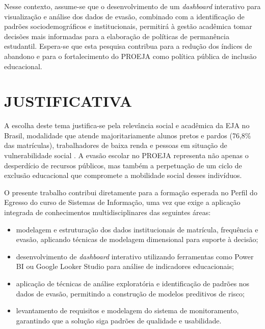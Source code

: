 \documentclass[12pt,a4paper]{article}
\begin{document}
Nesse contexto, assume-se que o desenvolvimento de um \textit{dashboard} interativo para visualização e análise dos dados de evasão, combinado com a identificação de padrões sociodemográficos e institucionais, permitirá à gestão acadêmica tomar decisões mais informadas para a elaboração de políticas de permanência estudantil. Espera-se que esta pesquisa contribua para a redução dos índices de abandono e para o fortalecimento do PROEJA como política pública de inclusão educacional.

\section{JUSTIFICATIVA}

A escolha deste tema justifica-se pela relevância social e acadêmica da EJA no Brasil, modalidade que atende majoritariamente alunos pretos e pardos (76,8\% das matrículas), trabalhadores de baixa renda e pessoas em situação de vulnerabilidade social \cite{todos2025}. A evasão escolar no PROEJA representa não apenas o desperdício de recursos públicos, mas também a perpetuação de um ciclo de exclusão educacional que compromete a mobilidade social desses indivíduos.

O presente trabalho contribui diretamente para a formação esperada no Perfil do Egresso do curso de Sistemas de Informação, uma vez que exige a aplicação integrada de conhecimentos multidisciplinares das seguintes áreas:

\begin{itemize}[leftmargin=1.25cm]
    \item[\textbf{Banco de Dados:}] modelagem e estruturação dos dados institucionais de matrícula, frequência e evasão, aplicando técnicas de modelagem dimensional para suporte à decisão;
    \item[\textbf{Business Intelligence:}] desenvolvimento de \textit{dashboard} interativo utilizando ferramentas como Power BI ou Google Looker Studio para análise de indicadores educacionais;
    \item[\textbf{Mineração de Dados:}] aplicação de técnicas de análise exploratória e identificação de padrões nos dados de evasão, permitindo a construção de modelos preditivos de risco;
    \item[\textbf{Engenharia de Software:}] levantamento de requisitos e modelagem do sistema de monitoramento, garantindo que a solução siga padrões de qualidade e usabilidade.
\end{itemize}
\end{document}
